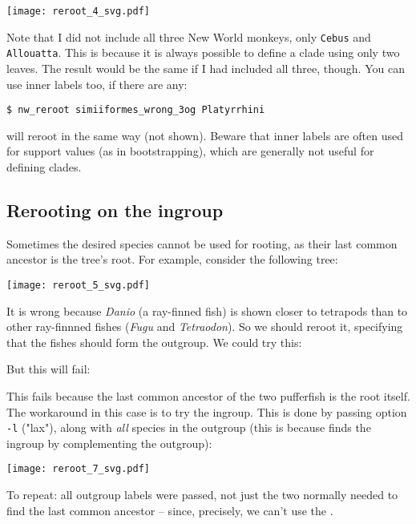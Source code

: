 

\begin{center}
\texttt{[image: reroot\_4\_svg.pdf]}
\end{center}

\noindent{}Note that I did not include all three New World monkeys, only \texttt{Cebus} and \texttt{Allouatta}. This is because it is always possible to define a clade using only two leaves. The result would be the same if I had included all three, though. You can use inner labels too, if there are any:
\begin{verbatim}
$ nw_reroot simiiformes_wrong_3og Platyrrhini
\end{verbatim}
will reroot in the same way (not shown). Beware that inner labels are often
used for support values (as in bootstrapping), which are generally not useful
for defining clades.

\subsection{Rerooting on the ingroup}

Sometimes the desired species cannot be used for rooting, as their last common ancestor is the tree's root. For example, consider the following tree:

\begin{center}
\texttt{[image: reroot\_5\_svg.pdf]}
\end{center}

\noindent{}It is wrong because \textit{Danio} (a ray-finned fish) is shown
closer to tetrapods than to other ray-finnned fishes (\textit{Fugu} and
\textit{Tetraodon}). So we should reroot it, specifying that the fishes should
form the outgroup. We could try this:



\noindent{}But this will fail:



\noindent{}This fails because the last common ancestor of the two pufferfish is
the root itself. The workaround in this case is to try the ingroup. This is
done by passing option \texttt{-l} ("lax"), along with \emph{all} species in
the outgroup (this is because \reroot{} finds the ingroup by complementing the
outgroup):


\begin{center}
\texttt{[image: reroot\_7\_svg.pdf]}
\end{center}

\noindent{}To repeat: all outgroup labels were passed, not just the two
normally needed to find the last common ancestor -- since, precisely, we can't
use the \lca.
